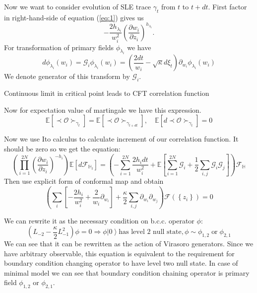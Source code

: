 \documentclass[12pt]{article}
\theoremstyle{definition}
\theoremstyle{definition} \newtheorem{Def}{Definition}
\begin{document}
Now we want to consider evolution of SLE trace $\gamma_{t}$ from  $t$ to $t+ dt$. First factor in right-hand-side of equation (\ref{eq:1}) gives us
\begin{equation*}
  -\frac{2h_{\lambda_{i}}}{w_{i}^{2}}\left(\frac{\partial w_{i}}{\partial z_{i}}\right)^{h_{\lambda_{i}}}.
\end{equation*}
For transformation of primary fields $\phi_{\lambda_{i}}$ we have 
\begin{equation}
  \label{eq:2}
  d\phi_{\lambda_{i}}(w_{i}) = \mathcal{G}_{i}\phi_{\lambda_{i}}(w_{i})=\left(\frac{2dt}{w_{i}}-\sqrt{\kappa} d\xi_{t}\right) \partial_{w_{i}}\phi_{\lambda_{i}}(w_{i}) 
\end{equation}
We denote generator of this transform by $\mathcal{G}_{i}$.



Continuous limit in critical point leads to CFT correlation function

Now for expectation value of martingale we have this expression.
\begin{equation*}
  \mathbb{E}\left[\prec\mathcal{O}\succ_{\gamma_{t}}\right]=    \mathbb{E}\left[\prec\mathcal{O}\succ_{\gamma_{t+dt}}\right], \quad \mathbb{E}\left[d \prec\mathcal{O}\succ_{\gamma_{t}}\right]=0
\end{equation*}

Now we use Ito calculus to calculate increment of our correlation function. It should be zero so we get the equation:
\begin{equation}
  \left(\prod_{i=1}^{2N}\left(\frac{\partial w_{i}}{\partial z_{i}}\right)^{-h_{i}}\right)\mathbb{E}\left[d 
    \mathcal{F}_{\mathbb{H}_{t}}\right]=\left(-\sum_{i=1}^{2N}\frac{2h_{i}dt}{w_{i}^{2}}+\mathbb{E}\left[\sum_{i=1}^{2N}\mathcal{G}_{i}+\frac{1}{2}
      \sum_{i,j}\mathcal{G}_{i}\mathcal{G}_{j}\right]\right)\mathcal{F}_{\mathbb{H}}
\label{eq:8}
\end{equation}
Then use explicit form of conformal map and obtain
\begin{equation*}
  \left( \sum_{i}\left[-\frac{2h_{i}}{w_{i}^{2}} +\frac{2}{w_{i}}\partial_{w_{i}}\right]+\frac{\kappa}{2}\sum_{i,j}\partial_{w_{i}} \partial_{w_{j}}\right)\mathcal{F}(\left\{z_{i}\right\})=0
\end{equation*}

We can rewrite it as the necessary condition on b.c.c. operator $\phi$:
\begin{equation*}
  (L_{-2}-\frac{\kappa}{2}L_{-1}^{2})\phi=0 \Longrightarrow \phi \left|0\right>  \text{has level 2 null state}, \phi\sim \phi_{1,2} \;\text{or}\; \phi_{2,1}
\end{equation*}
We can see that it can be rewritten as the action of Virasoro generators. Since we have arbitrary observable, this equation is equivalent to the requirement for boundary condition changing operator to have level two null state. 
In case of minimal model we can see that boundary condition chaining operator is primary field $\phi_{1,2}$ or $\phi_{2,1}$.
\end{document}
